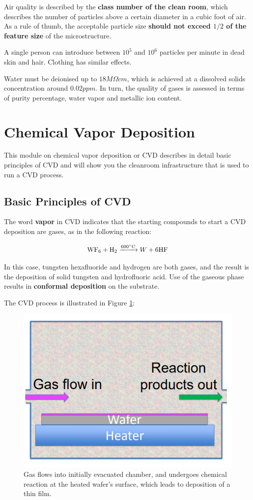\documentclass[12pt,a4paper]{report}
\begin{document}
Air quality is described by the \textbf{class number of the clean room}, which describes the number of particles above a certain diameter in a cubic foot of air. As a rule of thumb, the acceptable particle size \textbf{should not exceed $1/2$ of the feature size} of the microstructure.

A single person can introduce between $10^5$ and $10^6$ particles per minute in dead skin and hair. Clothing has similar effects.

Water must be deionised up to $18 M\Omega cm$, which is achieved at a dissolved solids concentration around $0.02 ppm$. In turn, the quality of gases is assessed in terms of purity percentage, water vapor and metallic ion content.

\section{Chemical Vapor Deposition}

This module on chemical vapor deposition or CVD describes in detail basic principles of CVD and will show you the cleanroom infrastructure that is used to run a CVD process.

\subsection{Basic Principles of CVD}

The word \textbf{vapor} in CVD indicates that the starting compounds to start a CVD deposition are gases, as in the following reaction:

\begin{equation}
    \text{WF}_6+\text{H}_2\xrightarrow{600\degree \text{C}}W+6 \text{HF}
\end{equation}

In this case, tungsten hexafluoride and hydrogen are both gases, and the result is the deposition of solid tungsten and hydrofluoric acid. Use of the gaseous phase results in \textbf{conformal deposition} on the substrate.

The CVD process is illustrated in Figure \ref{cvd.process}:

\begin{figure}
    \centering
    \includegraphics[width=0.5\linewidth]{CVD process.png}
    \caption{Gas flows into initially evacuated chamber, and undergoes chemical reaction at the heated wafer's surface, which leads to deposition of a thin film.}
    \label{cvd.process}
\end{figure}
\end{document}
